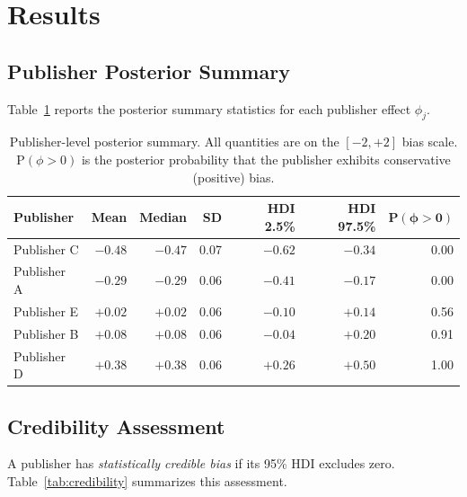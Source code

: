 \documentclass[10pt,letterpaper]{article}
\begin{document}
\section{Results}
\label{sec:results}

\subsection{Publisher Posterior Summary}

Table~\ref{tab:posterior_summary} reports the posterior summary statistics for
each publisher effect $\phi_j$.

\begin{table}[h]
\centering
\caption{Publisher-level posterior summary.  All quantities are on the $[-2,+2]$
bias scale.  $\mathrm{P}(\phi > 0)$ is the posterior probability that the
publisher exhibits conservative (positive) bias.}
\label{tab:posterior_summary}
\begin{tabular}{lrrrrrr}
\toprule
\textbf{Publisher} & \textbf{Mean} & \textbf{Median} & \textbf{SD}
  & \textbf{HDI 2.5\%} & \textbf{HDI 97.5\%} & $\mathbf{P(\phi > 0)}$ \\
\midrule
Publisher C & $-0.48$ & $-0.47$ & 0.07 & $-0.62$ & $-0.34$ & 0.00 \\
Publisher A & $-0.29$ & $-0.29$ & 0.06 & $-0.41$ & $-0.17$ & 0.00 \\
Publisher E & $+0.02$ & $+0.02$ & 0.06 & $-0.10$ & $+0.14$ & 0.56 \\
Publisher B & $+0.08$ & $+0.08$ & 0.06 & $-0.04$ & $+0.20$ & 0.91 \\
Publisher D & $+0.38$ & $+0.38$ & 0.06 & $+0.26$ & $+0.50$ & 1.00 \\
\bottomrule
\end{tabular}
\end{table}

\subsection{Credibility Assessment}

A publisher has \emph{statistically credible bias} if its 95\% HDI excludes zero.
Table~\ref{tab:credibility} summarizes this assessment.
\end{document}
